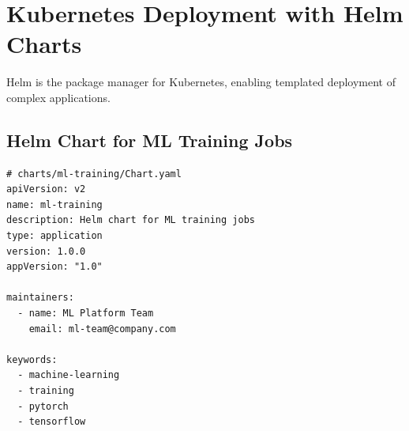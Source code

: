 \section{Kubernetes Deployment with Helm Charts}

Helm is the package manager for Kubernetes, enabling templated deployment of complex applications.

\subsection{Helm Chart for ML Training Jobs}

\begin{lstlisting}[style=yaml, caption=Helm Chart for ML Training]
# charts/ml-training/Chart.yaml
apiVersion: v2
name: ml-training
description: Helm chart for ML training jobs
type: application
version: 1.0.0
appVersion: "1.0"

maintainers:
  - name: ML Platform Team
    email: ml-team@company.com

keywords:
  - machine-learning
  - training
  - pytorch
  - tensorflow
\end{lstlisting}

